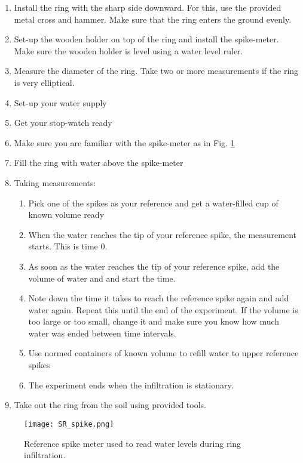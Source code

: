 \documentclass[
10pt, %
a4paper, %
oneside, %
headinclude,footinclude, %
BCOR5mm, %
]{scrartcl}
\begin{document}
\begin{enumerate}
	\item Install the ring with the sharp side downward. For this, use the provided metal cross and hammer. Make sure that the ring enters the ground evenly.  
	\item Set-up the wooden holder on top of the ring and install the spike-meter. Make sure the wooden holder is level using a water level ruler. 
	\item Measure the diameter of the ring. Take two or more measurements if the ring is very elliptical.
	\item Set-up your water supply 
	\item Get your stop-watch ready
	\item Make sure you are familiar with the spike-meter as in Fig. \ref{spike}
	\item Fill the ring with water above the spike-meter
	\item Taking measurements:
	\begin{enumerate}
		\item Pick one of the spikes as your reference and get a water-filled cup of known volume ready
		\item When the water reaches the tip of your reference spike, the measurement starts. This is time 0. 
		\item As soon as the water reaches the tip of your reference spike, add the volume of water and and start the time.
		\item Note down the time it takes to reach the reference spike again and add water again. Repeat this until the end of the experiment. If the volume is too large or too small, change it and make sure you know how much water was ended between time intervals.
		\item Use normed containers of known volume to refill water to upper reference spikes
		\item The experiment ends when the infiltration is stationary.
	\end{enumerate}
	\item Take out the ring from the soil using provided tools.
\end{enumerate}

\begin{figure}[!h]
	\centering
	\texttt{[image: SR\_spike.png]}
	\caption{\label{spike}Reference spike meter used to read water levels during ring infiltration.}
\end{figure}
\end{document}

